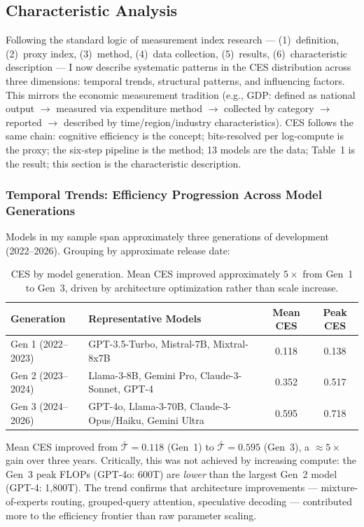 \documentclass[12pt]{article}
\begin{document}
\subsection{Characteristic Analysis}
\label{sec:characteristic-analysis}

Following the standard logic of measurement index research --- (1)~definition, (2)~proxy index, (3)~method, (4)~data collection, (5)~results, (6)~characteristic description --- I now describe systematic patterns in the CES distribution across three dimensions: temporal trends, structural patterns, and influencing factors. This mirrors the economic measurement tradition (e.g., GDP: defined as national output $\to$ measured via expenditure method $\to$ collected by category $\to$ reported $\to$ described by time/region/industry characteristics). CES follows the same chain: cognitive efficiency is the concept; bits-resolved per log-compute is the proxy; the six-step pipeline is the method; 13 models are the data; Table~1 is the result; this section is the characteristic description.

\subsubsection{Temporal Trends: Efficiency Progression Across Model Generations}

Models in my sample span approximately three generations of development (2022--2026). Grouping by approximate release date:

\begin{table}[H]
\centering
\small
\begin{tabular}{llcc}
\toprule
\textbf{Generation} & \textbf{Representative Models} & \textbf{Mean CES} & \textbf{Peak CES} \\
\midrule
Gen 1 (2022--2023) & GPT-3.5-Turbo, Mistral-7B, Mixtral-8x7B & 0.118 & 0.138 \\
Gen 2 (2023--2024) & Llama-3-8B, Gemini Pro, Claude-3-Sonnet, GPT-4 & 0.352 & 0.517 \\
Gen 3 (2024--2026) & GPT-4o, Llama-3-70B, Claude-3-Opus/Haiku, Gemini Ultra & 0.595 & 0.718 \\
\bottomrule
\end{tabular}
\caption{CES by model generation. Mean CES improved approximately $5\times$ from Gen~1 to Gen~3, driven by architecture optimization rather than scale increase.}
\label{tab:generation-ces}
\end{table}

Mean CES improved from $\bar{\mathcal{T}} = 0.118$ (Gen~1) to $\bar{\mathcal{T}} = 0.595$ (Gen~3), a ${\approx}5\times$ gain over three years. Critically, this was not achieved by increasing compute: the Gen~3 peak FLOPs (GPT-4o: 600T) are \textit{lower} than the largest Gen~2 model (GPT-4: 1,800T). The trend confirms that architecture improvements --- mixture-of-experts routing, grouped-query attention, speculative decoding --- contributed more to the efficiency frontier than raw parameter scaling.
\end{document}
